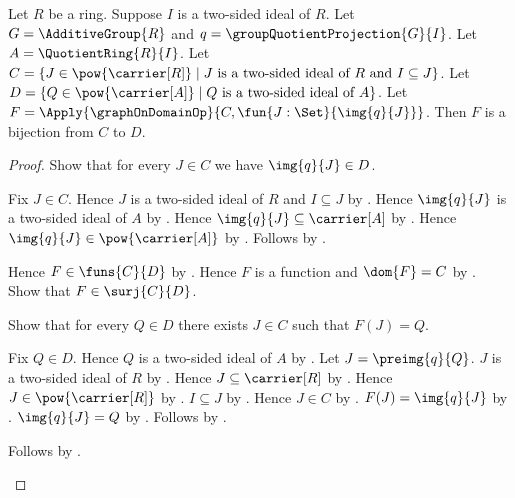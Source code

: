 \begin{theorem}\label{ring_ideal_correspondence_bijection}
    Let $R$ be a ring.
    Suppose $I$ is a two-sided ideal of $R$.
    Let $G=\AdditiveGroup{R}$ and
        $q=\groupQuotientProjection{G}{I}$.
    Let $A=\QuotientRing{R}{I}$.
    Let
        $C=\{J\in\pow{\carrier[R]}\mid
            \text{$J$ is a two-sided ideal of $R$ and
                $I\subseteq J$}\}$.
    Let
        $D=\{Q\in\pow{\carrier[A]}\mid
            \text{$Q$ is a two-sided ideal of $A$}\}$.
    Let
        $F=\Apply{\graphOnDomainOp}
            {C,\fun{J:\Set}{\img{q}{J}}}$.
    Then $F$ is a bijection from $C$ to $D$.
\end{theorem}
\begin{proof}
    Show that for every $J\in C$ we have $\img{q}{J}\in D$.
    \begin{subproof}
        Fix $J\in C$.
        Hence $J$ is a two-sided ideal of $R$ and
            $I\subseteq J$ by \auto.
        Hence $\img{q}{J}$ is a two-sided ideal of $A$ by
            .
        Hence $\img{q}{J}\subseteq\carrier[A]$ by
            .
        Hence $\img{q}{J}\in\pow{\carrier[A]}$ by
            .
        Follows by \auto.
    \end{subproof}
    Hence $F\in\funs{C}{D}$ by
        .
    Hence $F$ is a function and $\dom{F}=C$ by
        .
    Show that $F\in\surj{C}{D}$.
    \begin{subproof}
        Show that for every $Q\in D$ there exists $J\in C$ such that
            $F(J)=Q$.
        \begin{subproof}
            Fix $Q\in D$.
            Hence $Q$ is a two-sided ideal of $A$ by \auto.
            Let $J=\preimg{q}{Q}$.
            $J$ is a two-sided ideal of $R$ by
                .
            Hence $J\subseteq\carrier[R]$ by
                .
            Hence $J\in\pow{\carrier[R]}$ by .
            $I\subseteq J$ by
                .
            Hence $J\in C$ by \auto.
            $F(J)=\img{q}{J}$ by
                .
            $\img{q}{J}=Q$ by
                .
            Follows by \auto.
        \end{subproof}
        Follows by .

\end{subproof}
\end{proof}
